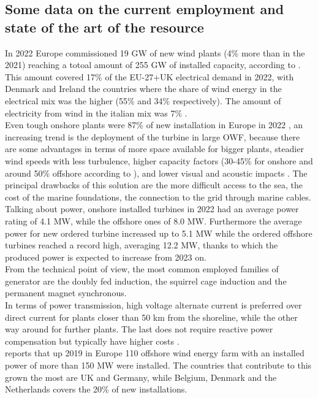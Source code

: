 \subsection{Some data on the current employment and state of the art of the resource}
In 2022 Europe commissioned 19 GW of new wind plants (4\% more than in the 2021) reaching a totoal amount of 255 GW of installed capacity, according to \cite{wind_europe_data_2022}. This amount covered 17\% of the EU-27+UK electrical demand in 2022, with Denmark and Ireland the countries where the share of wind energy in the electrical mix was the higher (55\% and 34\% respectively). The amount of electricity from wind in the italian mix was 7\% \cite{wind_europe_data_2022}.\\
Even tough onshore plants were 87\% of new installation in Europe in 2022 \cite{wind_europe_data_2022}, an increasing trend is the deployment of the turbine in large \acrfull{OWF}, because there are some advantages in terms of more space available for bigger plants, steadier wind speeds with less turbulence, higher capacity factors (30-45\% for onshore and around 50\% offshore according to \cite{wind_europe_data_2022}), and lower visual and acoustic impacts \cite{current_staus_and_future_trends_of_offshore_wind_power_in_europe}. The principal drawbacks of this solution are the more difficult access to the sea, the cost of the marine foundations, the connection to the grid through marine cables.  \\
Talking about power, onshore installed turbines in 2022 had an average power rating of 4.1 MW, while the offshore ones of 8.0 MW. Furthermore the average power for new ordered turbine increased up to 5.1 MW while the ordered offshore turbines reached a record high, averaging 12.2 MW, thanks to which the produced power is expected to increase from 2023 on.\\

From the technical point of view, the most common employed families of generator are the doubly fed induction, the squirrel cage induction and the permanent magnet synchronous.\\
In terms of power transmission, high voltage alternate current is preferred over direct current for plants closer than 50 km from the shoreline, while the other way around for further plants. The last does not require reactive power compensation but typically have higher costs \cite{current_staus_and_future_trends_of_offshore_wind_power_in_europe}.\\
\cite{current_staus_and_future_trends_of_offshore_wind_power_in_europe} reports that up 2019 in Europe 110 offshore wind energy farm with an installed power of more than 150 MW were installed. The countries that contribute to this grown the most are UK and Germany, while Belgium, Denmark and the Netherlands covers the 20\% of new installations.

